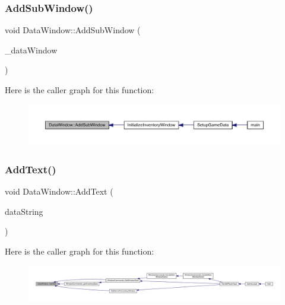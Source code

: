 \subsubsection{\texorpdfstring{Add\+Sub\+Window()}{AddSubWindow()}}
{\footnotesize\ttfamily void Data\+Window\+::\+Add\+Sub\+Window (\begin{DoxyParamCaption}\item[{\mbox{\hyperlink{class_data_window}{Data\+Window}}}]{\+\_\+data\+Window }\end{DoxyParamCaption})}

Here is the caller graph for this function\+:
\nopagebreak
\begin{figure}[H]
\begin{center}
\leavevmode
\includegraphics[width=350pt]{d1/def/class_data_window_a0e57ffff01c3dad8282f9768a3c9e949_icgraph}
\end{center}
\end{figure}
\mbox{\label{class_data_window_a8bec28c4e6514e9b62b10686e0e9b40d}} 
\subsubsection{\texorpdfstring{Add\+Text()}{AddText()}}
{\footnotesize\ttfamily void Data\+Window\+::\+Add\+Text (\begin{DoxyParamCaption}\item[{std\+::string const \&}]{data\+String }\end{DoxyParamCaption})}

Here is the caller graph for this function\+:
\nopagebreak
\begin{figure}[H]
\begin{center}
\leavevmode
\includegraphics[width=350pt]{d1/def/class_data_window_a8bec28c4e6514e9b62b10686e0e9b40d_icgraph}
\end{center}
\end{figure}
\mbox{\label{class_data_window_ab86de68d9766781ee295c69dbee5a985}} 
